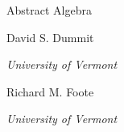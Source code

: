 
\startstandardmakeup
  [
    align=center,
    pagestate=start,
    style=\tfb\setupinterlinespace,
  ]

  {\scd Abstract Algebra}

  \blank[4*line]

  David S. Dummit

  {\it University of Vermont}

  \blank[2*line]

  Richard M. Foote

  {\it University of Vermont}

\stopstandardmakeup

